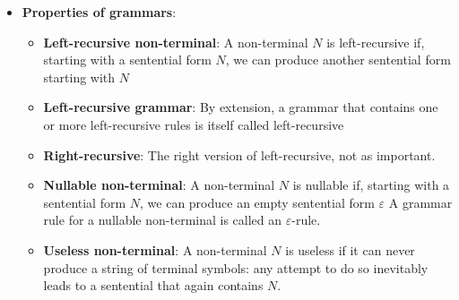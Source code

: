 \documentclass{report}
\begin{document}
\begin{itemize}
            \bigbreak \noindent 
            The format described so far is known as BNF, which may be considered an abbreviation of Backus–Naur Form or of Backus Normal Form. It is very suitable for expressing nesting and recursion, but less convenient for expressing repetition and optionality, although it can of course express repetition through recursion. To remedy this, three additional notations are introduced, each in the form of a postfix operator:
            \begin{itemize}
                \item $R^{+}$: Indicates the occurrence of one or more $R$s, to express repetition
                \item $R^{?}$: Indicates the occurrence of zero or one $R$s, to express optionality
                \item $R^{*}$: Indicates the occurrence of zero or more $R$s, to express optional repetition
            \end{itemize}
            Parentheses may be needed if these postfix operators are to operate on more than one grammar symbol. The grammar notation that allows the above forms is called EBNF, for Extended BNF. An example is the grammar rule
            \begin{align*}
                \text{paramater\_list } \to \text{ ('IN' \; $\mid$ \; 'OUT')}^{?} \text{ identitfier (',' identifier)}^{*}
            .\end{align*}
        \item \textbf{Properties of grammars}: 
            \begin{itemize}
                \item \textbf{Left-recursive non-terminal}: A non-terminal $N$ is left-recursive if, starting with a sentential form $N$, we can produce another sentential form starting with $N$
                \item \textbf{Left-recursive grammar}:  By extension, a grammar that contains one or more left-recursive rules is itself called left-recursive
                \item \textbf{Right-recursive}: The right version of left-recursive, not as important.
                \item \textbf{Nullable non-terminal}: A non-terminal $N$ is nullable if, starting with a sentential form $N$, we can produce an empty sentential form $\varepsilon$
                    \bigbreak \noindent 
                    A grammar rule for a nullable non-terminal is called an $\varepsilon$-rule.
                \item \textbf{Useless non-terminal}: A non-terminal $N$ is useless if it can never produce a string of terminal symbols: any attempt to do so inevitably leads to a sentential that again contains $N$. 

\end{itemize}
\end{itemize}
\end{document}
